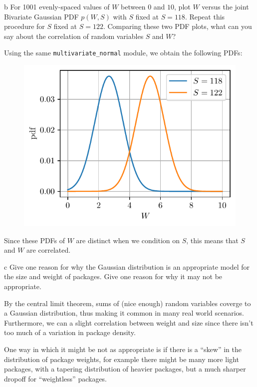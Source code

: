 \documentclass[expanded]{pset}
\begin{document}
\begin{parts}
  \begin{part}{b}
     For 1001 evenly-spaced values of $W$ between $0$ and $10$, plot $W$ versus the joint Bivariate Gaussian PDF $p(W, S)$ with $S$ fixed at $S=118$. Repeat this procedure for $S$ fixed at $S=122$. Comparing these two PDF plots, what can you say about the correlation of random variables $S$ and $W$?
  \end{part}

  Using the same \texttt{multivariate\_normal} module, we obtain the following PDFs:

  \begin{figure}[ht]
    \centering
    \includegraphics[]{3b.pdf}
  \end{figure}\noindent
  Since these PDFs of $W$ are distinct when we condition on $S$, this means that $S$ and $W$ are correlated.

  \begin{part}{c}
     Give one reason for why the Gaussian distribution is an appropriate model for the size and weight of packages. Give one reason for why it may not be appropriate.
  \end{part}

  By the central limit theorem, sums of (nice enough) random variables coverge to a Gaussian distribution, thus making it common in many real world scenarios. Furthermore, we can a slight correlation between weight and size since there isn't too much of a variation in package density.

  One way in which it might be not as appropriate is if there is a ``skew'' in the distribution of package weights, for example there might be many more light packages, with a tapering distribution of heavier packages, but a much sharper dropoff for ``weightless'' packages.


\end{parts}
\end{document}
